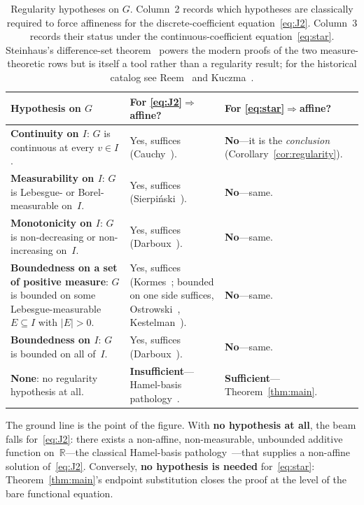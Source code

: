 \documentclass{article}
\theoremstyle{plain}
\theoremstyle{definition}
\newcommand{\R}{\mathbb{R}}
\begin{document}
\begin{table}[ht]
\renewcommand{\arraystretch}{1.4}
\centering
\begin{tabularx}{\linewidth}{@{} >{\raggedright\arraybackslash}X |
  >{\raggedright\arraybackslash}X |
  >{\raggedright\arraybackslash}X @{}}
\toprule
\textbf{Hypothesis on $G$} &
\textbf{For \eqref{eq:J2}$\Rightarrow$affine?} &
\textbf{For \eqref{eq:star}$\Rightarrow$affine?} \\
\midrule
\textbf{Continuity on $I$}: $G$ is continuous at every $v\in I$.
  & Yes, suffices (Cauchy~\cite{Cauchy1821}).
  & \textbf{No}---it is the \emph{conclusion} (Corollary~\ref{cor:regularity}). \\
\midrule
\textbf{Measurability on $I$}: $G$ is Lebesgue- or Borel-measurable on~$I$.
  & Yes, suffices (Sierpi\'nski~\cite{Sierpinski1920}).
  & \textbf{No}---same. \\
\midrule
\textbf{Monotonicity on $I$}: $G$ is non-decreasing or non-increasing on~$I$.
  & Yes, suffices (Darboux~\cite{Darboux1875}).
  & \textbf{No}---same. \\
\midrule
\textbf{Boundedness on a set of positive measure}: $G$ is bounded on some
  Lebesgue-measurable $E\subseteq I$ with $|E|>0$.
  & Yes, suffices (Kormes~\cite{Kormes1926}; bounded on one side
    suffices, Ostrowski~\cite{Ostrowski1929},
    Kestelman~\cite{Kestelman1947}).
  & \textbf{No}---same. \\
\midrule
\textbf{Boundedness on $I$}: $G$ is bounded on all of~$I$.
  & Yes, suffices (Darboux~\cite{Darboux1880}).
  & \textbf{No}---same. \\
\midrule
\textbf{None}: no regularity hypothesis at all.
  & \textbf{Insufficient}---Hamel-basis pathology~\cite{Hamel1905}.
  & \textbf{Sufficient}---Theorem~\ref{thm:main}. \\
\bottomrule
\end{tabularx}
\caption{Regularity hypotheses on $G$. Column~2 records which hypotheses
are classically required to force affineness for the
discrete-coefficient equation~\eqref{eq:J2}. Column~3 records their
status under the continuous-coefficient equation~\eqref{eq:star}.
Steinhaus's difference-set theorem~\cite{Steinhaus1920} powers the
modern proofs of the two measure-theoretic rows but is itself a tool
rather than a regularity result; for the historical catalog see
Reem~\cite{Reem2017} and Kuczma~\cite[\S13.2]{Kuczma2009}.}
\label{tab:dictionary}
\end{table}

The ground line is the point of the figure. With \textbf{no
hypothesis at all}, the beam falls for~\eqref{eq:J2}: there exists a
non-affine, non-measurable, unbounded additive function
on~$\R$---the classical Hamel-basis pathology~\cite{Hamel1905}---that
supplies a non-affine solution of~\eqref{eq:J2}. Conversely,
\textbf{no hypothesis is needed} for~\eqref{eq:star}:
Theorem~\ref{thm:main}'s endpoint substitution closes the proof at
the level of the bare functional equation.
\end{document}
